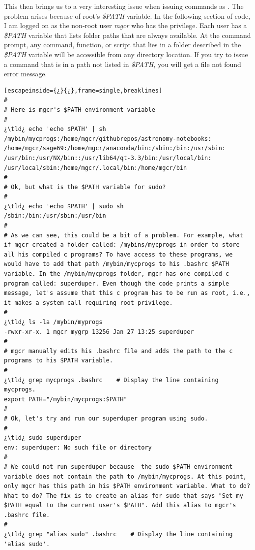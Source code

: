 This then brings us to a very interesting issue when issuing commands as . The problem arises because of root's \emph{\$PATH} variable. In the following section of code, I am logged on as the non-root user \emph{mgcr} who has the  privilege. Each user has a \emph{\$PATH}  variable that lists folder paths that are always available. At the command prompt, any command, function, or script that lies in a folder described in the \emph{\$PATH}  variable will be accessible from any directory location. If you try to issue a command that is in a path not listed in \emph{\$PATH}, you will get a file not found error message.

\begin{lstlisting}[escapeinside={¿}{¿},frame=single,breaklines]
#
# Here is mgcr's $PATH environment variable
#
¿\tld¿ echo 'echo $PATH' | sh
/mybin/mycprogs:/home/mgcr/githubrepos/astronomy-notebooks:
/home/mgcr/sage69:/home/mgcr/anaconda/bin:/sbin:/bin:/usr/sbin:
/usr/bin:/usr/NX/bin::/usr/lib64/qt-3.3/bin:/usr/local/bin:
/usr/local/sbin:/home/mgcr/.local/bin:/home/mgcr/bin
#
# Ok, but what is the $PATH variable for sudo?
#
¿\tld¿ echo 'echo $PATH' | sudo sh
/sbin:/bin:/usr/sbin:/usr/bin
#
# As we can see, this could be a bit of a problem. For example, what if mgcr created a folder called: /mybins/mycprogs in order to store all his compiled c programs? To have access to these programs, we would have to add that path /mybin/mycprogs to his .bashrc $PATH variable. In the /mybin/mycprogs folder, mgcr has one compiled c program called: superduper. Even though the code prints a simple message, let's assume that this c program has to be run as root, i.e., it makes a system call requiring root privilege.
#
¿\tld¿ ls -la /mybin/myprogs
-rwxr-xr-x. 1 mgcr mygrp 13256 Jan 27 13:25 superduper
#
# mgcr manually edits his .bashrc file and adds the path to the c programs to his $PATH variable.
#
¿\tld¿ grep mycprogs .bashrc	# Display the line containing mycprogs.
export PATH="/mybin/mycprogs:$PATH"
#
# Ok, let's try and run our superduper program using sudo.
#
¿\tld¿ sudo superduper
env: superduper: No such file or directory
#
# We could not run superduper because  the sudo $PATH environment variable does not contain the path to /mybin/mycprogs. At this point, only mgcr has this path in his $PATH environment variable. What to do? What to do? The fix is to create an alias for sudo that says "Set my $PATH equal to the current user's $PATH". Add this alias to mgcr's .bashrc file.
#
¿\tld¿ grep "alias sudo" .bashrc	# Display the line containing 'alias sudo'.

\end{lstlisting}
